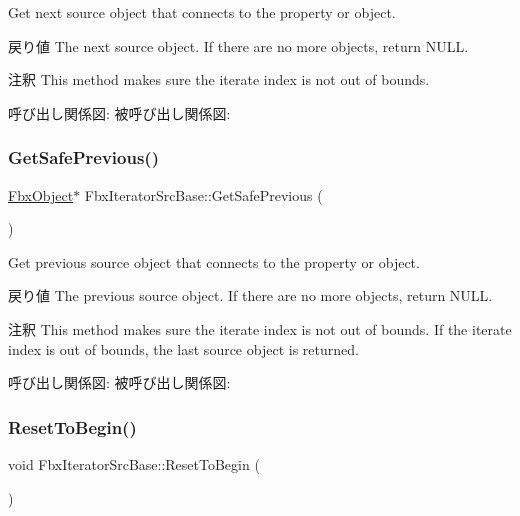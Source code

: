 Get next source object that connects to the property or object. \begin{DoxyReturn}{戻り値}
The next source object. If there are no more objects, return N\+U\+LL. 
\end{DoxyReturn}
\begin{DoxyRemark}{注釈}
This method makes sure the iterate index is not out of bounds. 
\end{DoxyRemark}
呼び出し関係図\+:
被呼び出し関係図\+:
\mbox{\label{class_fbx_iterator_src_base_a9ddd3ce318c6db15ec02ede17541f9ef}} 
\subsubsection{\texorpdfstring{Get\+Safe\+Previous()}{GetSafePrevious()}}
{\footnotesize\ttfamily \hyperlink{class_fbx_object}{Fbx\+Object}$\ast$ Fbx\+Iterator\+Src\+Base\+::\+Get\+Safe\+Previous (\begin{DoxyParamCaption}{ }\end{DoxyParamCaption})}

Get previous source object that connects to the property or object. \begin{DoxyReturn}{戻り値}
The previous source object. If there are no more objects, return N\+U\+LL. 
\end{DoxyReturn}
\begin{DoxyRemark}{注釈}
This method makes sure the iterate index is not out of bounds. If the iterate index is out of bounds, the last source object is returned. 
\end{DoxyRemark}
呼び出し関係図\+:
被呼び出し関係図\+:
\mbox{\label{class_fbx_iterator_src_base_af425474061cfa1a1ae0714dfedd6ddbb}} 
\subsubsection{\texorpdfstring{Reset\+To\+Begin()}{ResetToBegin()}}
{\footnotesize\ttfamily void Fbx\+Iterator\+Src\+Base\+::\+Reset\+To\+Begin (\begin{DoxyParamCaption}{ }\end{DoxyParamCaption})\hspace{0.3cm}{\ttfamily [protected]}}

